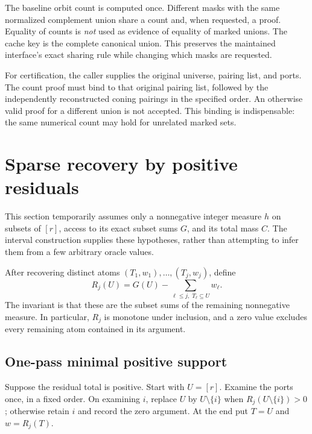\documentclass[11pt,letterpaper]{article}
\theoremstyle{definition}\newtheorem{definition}[theorem]{Definition}
\theoremstyle{remark}\newtheorem{remark}[theorem]{Remark}
\newcommand{\ports}{[r]}
\begin{document}
The baseline orbit count is computed once. Different masks with the same normalized complement union share a count and, when requested, a proof. Equality of counts is \emph{not} used as evidence of equality of marked unions. The cache key is the complete canonical union. This preserves the maintained interface's exact sharing rule while changing which masks are requested.

For certification, the caller supplies the original universe, pairing list, and ports. The count proof must bind to that original pairing list, followed by the independently reconstructed coning pairings in the specified order. An otherwise valid proof for a different union is not accepted. This binding is indispensable: the same numerical count may hold for unrelated marked sets.

\section{Sparse recovery by positive residuals}
\label{sec:peeling}

This section temporarily assumes only a nonnegative integer measure $h$ on subsets of $\ports$, access to its exact subset sums $G$, and its total mass $C$. The interval construction supplies these hypotheses, rather than attempting to infer them from a few arbitrary oracle values.

After recovering distinct atoms $(T_1,w_1),\ldots,(T_j,w_j)$, define
\begin{equation}
R_j(U)=G(U)-\sum_{\ell\le j,\;T_\ell\subseteq U}w_\ell.
\label{eq:residual}
\end{equation}
The invariant is that these are the subset sums of the remaining nonnegative measure. In particular, $R_j$ is monotone under inclusion, and a zero value excludes every remaining atom contained in its argument.

\subsection{One-pass minimal positive support}

Suppose the residual total is positive. Start with $U=\ports$. Examine the ports once, in a fixed order. On examining $i$, replace $U$ by $U\setminus\{i\}$ when
$R_j(U\setminus\{i\})>0$; otherwise retain $i$ and record the zero argument. At the end put $T=U$ and $w=R_j(T)$.
\end{document}
